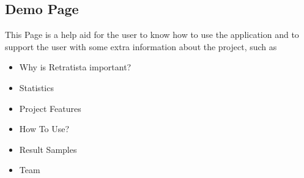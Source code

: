 \subsection{Demo Page}
This Page is a help aid for the user to know how to use the application and to support the user with some extra information about the project, such as
\begin{itemize}
    \item Why is Retratista important?
    \item Statistics
    \item Project Features
    \item How To Use?
    \item Result Samples
    \item Team
\end{itemize}
